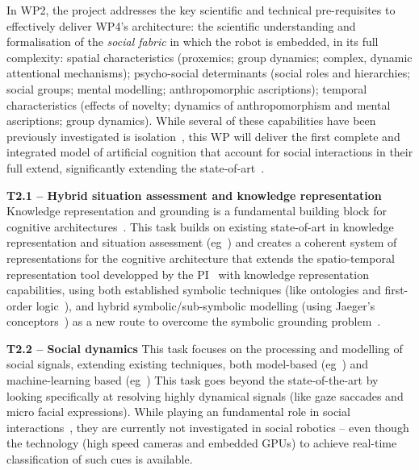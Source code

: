 \documentclass[11pt,a4paper]{report}
\begin{document}
\noindent{}

In WP2, the project addresses the key scientific and technical pre-requisites to
effectively deliver WP4's architecture:  the scientific understanding and
formalisation of the \emph{social fabric} in which the robot is embedded, in its
full complexity: spatial characteristics (proxemics; group dynamics; complex,
dynamic attentional mechanisms); psycho-social determinants (social roles and
hierarchies; social groups; mental modelling; anthropomorphic ascriptions);
temporal characteristics (effects of novelty; dynamics of anthropomorphism and
mental ascriptions; group dynamics).  While several of these capabilities have
been previously investigated is isolation~\cite{lemaignan2014dynamics,
flook2019impact,lemaignan2015youre, fink2014which, ros2010which,
warnier2012when, lemaignan2015mutual, dillenbourg2016symmetry,
winkle2019effective}, this WP will deliver the first complete and integrated
model of artificial cognition that account for social interactions in their full
extend, significantly extending the state-of-art~\cite{lemaignan2017artificial,
baxter2016cognitive}.


\textbf{T2.1 -- Hybrid situation assessment and knowledge representation}
Knowledge representation and grounding is a fundamental building block for
cognitive architectures~\cite{lemaignan2017artificial,beetz2010cram}. This task
builds on existing state-of-art in knowledge representation and situation
assessment (eg~\cite{citeneeded}) and creates a coherent system of
representations for the cognitive architecture that extends the 
spatio-temporal representation tool developped by the
PI~\cite{lemaignan2018underworlds,sallami2019simulation} with knowledge
representation capabilities, using both established symbolic techniques (like
ontologies and first-order logic~\cite{lemaignan2010oro, tenorth2009knowrob}),
and hybrid symbolic/sub-symbolic modelling (using Jaeger's
conceptors~\cite{jaeger2014controlling}) as a new route to overcome the symbolic
grounding problem~\cite{harnad1990symbol}.

\textbf{T2.2 -- Social dynamics} This task focuses on the processing and
modelling of social signals, extending existing techniques, both model-based
(eg~\cite{lemaignan2016realtime,others}) and machine-learning based
(eg~\cite{chetouani,others}) This task goes beyond the state-of-the-art by
looking specifically at resolving highly dynamical signals (like gaze saccades
and micro facial expressions). While playing an fundamental role in social
interactions~\cite{citeneeded}, they are currently not investigated in social
robotics -- even though the technology (high speed cameras and embedded GPUs) to
achieve real-time classification of such cues is available.
\end{document}
